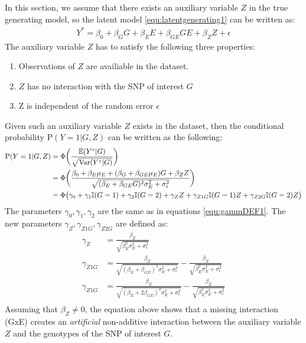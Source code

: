 In this section, we assume that there exists an auxiliary variable $Z$ in the true generating model, so the latent model \ref{equ:latentgenerating1} can be written as:
\begin{equation}\label{equ:latentaux}
\begin{aligned}
Y^* = \beta_0+\beta_GG + \beta_EE + \beta_{GE}GE + \beta_{Z}Z + \epsilon
\end{aligned}
\end{equation}
The auxiliary variable $Z$ has to satisfy the following three properties:
\begin{enumerate}\label{req:aux}
  \item Observations of $Z$ are availiable in the dataset.
  \item $Z$ has no interaction with the SNP of interest $G$
  \item Z is independent of the random error $\epsilon$
\end{enumerate}
Given such an auxiliary variable $Z$ exists in the dataset, then the conditional probability $\text{P}(Y=1|G,Z)$ can be written as the following:
\begin{equation}\label{equ:simModelAdditiveAux}
\begin{aligned}
\text{P}(Y=1|G,Z) &= \Phi\bigg(\frac{\mathbb{E}(Y^*|G)}{\sqrt{\text{Var}(Y^*|G)}}\bigg)\\
                  &= \Phi\bigg(\frac{\beta_0+ \beta_E \mu_E + (\beta_G +\beta_{GE}\mu_E)G + \beta_ZZ}{\sqrt{(\beta_E + \beta_{GE}G)^2 \sigma_E^2 + \sigma_\epsilon^2}}\bigg)\\
                  &= \Phi\big(\gamma_0 + \gamma_1 \mathbb{I}(G=1) + \gamma_2 \mathbb{I}(G=2) + \gamma_Z Z + \gamma_{Z1G}\mathbb{I}(G=1) Z + \gamma_{Z2G}\mathbb{I}(G=2) Z \big)
\end{aligned}
\end{equation}
The parameters $\gamma_0,\gamma_1,\gamma_2$ are the same as in equations \ref{equ:gammDEF1}. The new parameters $\gamma_{Z},\gamma_{Z1G},\gamma_{Z2G}$ are defined as:
\begin{equation}\label{equ:gammDEF2}
\begin{aligned}
\gamma_Z &= \frac{\beta_Z}{\sqrt{\beta_E^2 \sigma_E^2 + \sigma_\epsilon^2}}\\
\gamma_{Z1G} &= \frac{\beta_Z}{\sqrt{(\beta_E + \beta_{GE})^2 \sigma_E^2 + \sigma_\epsilon^2}} - \frac{\beta_Z}{\sqrt{\beta_E^2 \sigma_E^2 + \sigma_\epsilon^2}}\\
\gamma_{Z1G} &= \frac{\beta_Z}{\sqrt{(\beta_E + 2\beta_{GE})^2 \sigma_E^2 + \sigma_\epsilon^2}} - \frac{\beta_Z}{\sqrt{\beta_E^2 \sigma_E^2 + \sigma_\epsilon^2}}\\
\end{aligned}
\end{equation}
Assuming that $\beta_Z \neq 0$, the equation above shows that a missing interaction (GxE) creates an \textit{artificial} non-additive interaction between the auxiliary variable $Z$ and the genotypes of the SNP of interest $G$.


